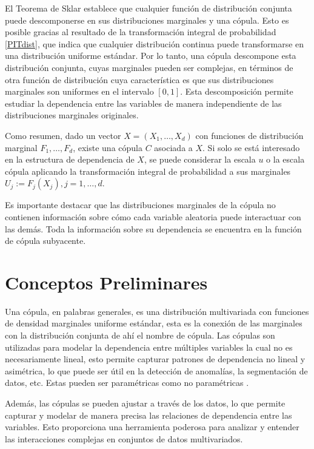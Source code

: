 El Teorema de Sklar establece que cualquier función de distribución conjunta puede descomponerse en sus distribuciones marginales y una cópula. Esto es posible gracias al resultado de la transformación integral de probabilidad \eqref{PITdist}, que indica que cualquier distribución continua puede transformarse en una distribución uniforme estándar. Por lo tanto, una cópula descompone esta distribución conjunta, cuyas marginales pueden ser complejas, en términos de otra función de distribución cuya característica es que sus distribuciones marginales son uniformes en el intervalo $[0,1]$. Esta descomposición permite estudiar la dependencia entre las variables de manera independiente de las distribuciones marginales originales.

Como resumen, dado un vector $X = (X_1, \dots, X_d)$ con funciones de distribución marginal $F_1, \dots, F_d$, existe una cópula $C$ asociada a $X$. Si solo se está interesado en la estructura de dependencia de $X$, se puede considerar la escala $u$ o la escala cópula aplicando la transformación integral de probabilidad a sus marginales $U_j := F_j(X_j), j = 1, \dots, d$.

Es importante destacar que las distribuciones marginales de la cópula no contienen información sobre cómo cada variable aleatoria puede interactuar con las demás. Toda la información sobre su dependencia se encuentra en la función de cópula subyacente.

\section{Conceptos Preliminares}

Una cópula, en palabras generales, es una distribución multivariada con funciones de densidad marginales uniforme estándar, esta es la conexión de las marginales con la distribución conjunta de ahí el nombre de cópula. Las cópulas son utilizadas para modelar la dependencia entre múltiples variables la cual no es necesariamente lineal, esto permite capturar patrones de dependencia no lineal y asimétrica, lo que puede ser útil en la detección de anomalías, la segmentación de datos, etc. Estas pueden ser paramétricas como no paramétricas \cite{CopulasR}.

Además, las cópulas se pueden ajustar a través de los datos, lo que permite capturar y modelar de manera precisa las relaciones de dependencia entre las variables. Esto proporciona una herramienta poderosa para analizar y entender las interacciones complejas en conjuntos de datos multivariados.

